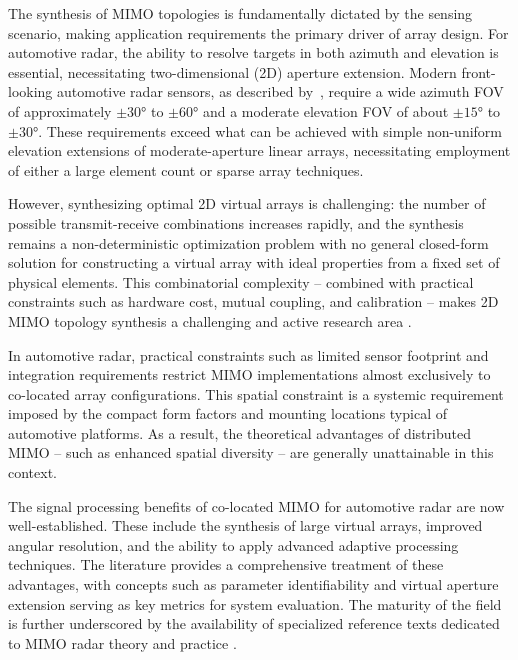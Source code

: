 The synthesis of MIMO topologies is fundamentally dictated by the sensing scenario, making application requirements the primary driver of array design.
For automotive radar, the ability to resolve targets in both azimuth and elevation is essential, necessitating two-dimensional (2D) aperture extension.
Modern front-looking automotive radar sensors, as described by~\textcite{waldschmidtAutomotiveRadarFirst2021}, require a wide azimuth FOV of approximately $\pm\ang{30}$ to $\pm\ang{60}$ and a moderate elevation FOV of about $\pm\ang{15}$ to $\pm\ang{30}$.
These requirements exceed what can be achieved with simple non-uniform elevation extensions of moderate-aperture linear arrays, necessitating employment of either a large element count or sparse array techniques.

However, synthesizing optimal 2D virtual arrays is challenging: the number of possible transmit-receive combinations increases rapidly, and the synthesis remains a non-deterministic optimization problem with no general closed-form solution for constructing a virtual array with ideal properties from a fixed set of physical elements.
This combinatorial complexity -- combined with practical constraints such as hardware cost, mutual coupling, and calibration -- makes 2D MIMO topology synthesis a challenging and active research area \parencite{zhugeStudyTwoDimensionalSparse2012}.

In automotive radar, practical constraints such as limited sensor footprint and integration requirements restrict MIMO implementations almost exclusively to co-located array configurations.
This spatial constraint is a systemic requirement imposed by the compact form factors and mounting locations typical of automotive platforms.
As a result, the theoretical advantages of distributed MIMO -- such as enhanced spatial diversity -- are generally unattainable in this context.

The signal processing benefits of co-located MIMO for automotive radar are now well-established.
These include the synthesis of large virtual arrays, improved angular resolution, and the ability to apply advanced adaptive processing techniques.
The literature provides a comprehensive treatment of these advantages, with concepts such as parameter identifiability \parencite{liParameterIdentifiabilityMIMO2007} and virtual aperture extension \parencite{liMIMORadarColocated2007} serving as key metrics for system evaluation.
The maturity of the field is further underscored by the availability of specialized reference texts dedicated to MIMO radar theory and practice \parencite{liMIMORadarSignal2025}.

